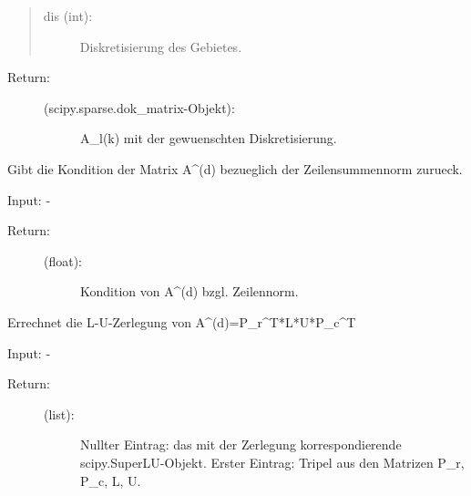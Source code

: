 \documentclass[letterpaper,10pt,ngerman]{sphinxmanual}
\begin{document}
\begin{fulllineitems}
\begin{fulllineitems}
\begin{quote}
\begin{description}
\item[{dis (int):}] \leavevmode
Diskretisierung des Gebietes.

\end{description}
\end{quote}
\begin{description}
\item[{Return:}] \leavevmode\begin{description}
\item[{(scipy.sparse.dok\_matrix-Objekt):}] \leavevmode
A\_l(k) mit der gewuenschten Diskretisierung.

\end{description}

\end{description}

\end{fulllineitems}


\begin{fulllineitems}
\label{\detokenize{index:sparse_erw.Sparse.kond_a_d_zs}}
Gibt die Kondition der Matrix A\textasciicircum{}(d) bezueglich der Zeilensummennorm zurueck.

Input: -
\begin{description}
\item[{Return:}] \leavevmode\begin{description}
\item[{(float):}] \leavevmode
Kondition von A\textasciicircum{}(d) bzgl. Zeilennorm.

\end{description}

\end{description}

\end{fulllineitems}


\begin{fulllineitems}
\label{\detokenize{index:sparse_erw.Sparse.l_u_zerl}}
Errechnet die L-U-Zerlegung von A\textasciicircum{}(d)=P\_r\textasciicircum{}T*L*U*P\_c\textasciicircum{}T

Input: -
\begin{description}
\item[{Return:}] \leavevmode\begin{description}
\item[{(list):}] \leavevmode
Nullter Eintrag: das mit der Zerlegung korrespondierende scipy.SuperLU-Objekt.
Erster Eintrag: Tripel aus den Matrizen P\_r, P\_c, L, U.


\end{description}
\end{description}
\end{fulllineitems}
\end{fulllineitems}
\end{document}
